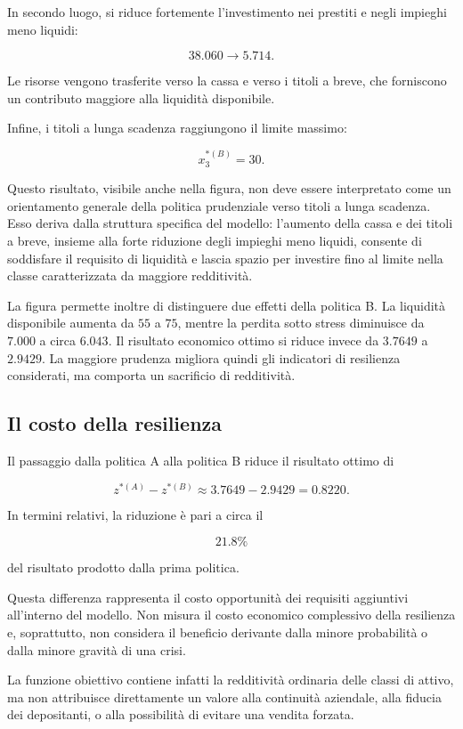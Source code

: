 In secondo luogo, si riduce fortemente l'investimento nei prestiti e negli
impieghi meno liquidi:

\[
38.060
\longrightarrow
5.714.
\]

Le risorse vengono trasferite verso la cassa e verso i titoli a breve, che
forniscono un contributo maggiore alla liquidit\`a disponibile.

Infine, i titoli a lunga scadenza raggiungono il limite massimo:

\[
x_3^{*(B)}=30.
\]

Questo risultato, visibile anche nella figura, non deve essere interpretato
come un orientamento generale della politica prudenziale verso titoli a lunga
scadenza. Esso deriva dalla struttura specifica del modello: l'aumento della
cassa e dei titoli a breve, insieme alla forte riduzione degli impieghi meno
liquidi, consente di soddisfare il requisito di liquidit\`a e lascia spazio
per investire fino al limite nella classe caratterizzata da maggiore
redditivit\`a.

La figura permette inoltre di distinguere due effetti della politica B. La
liquidit\`a disponibile aumenta da \(55\) a \(75\), mentre la perdita sotto
stress diminuisce da \(7.000\) a circa \(6.043\). Il risultato economico
ottimo si riduce invece da \(3.7649\) a \(2.9429\). La maggiore prudenza
migliora quindi gli indicatori di resilienza considerati, ma comporta un
sacrificio di redditivit\`a.

\subsection{Il costo della resilienza}

Il passaggio dalla politica A alla politica B riduce il risultato ottimo di

\[
z^{*(A)}-z^{*(B)}
\approx
3.7649-2.9429
=
0.8220.
\]

In termini relativi, la riduzione \`e pari a circa il

\[
21.8\%
\]

\noindent del risultato prodotto dalla prima politica.

Questa differenza rappresenta il costo opportunit\`a dei requisiti aggiuntivi
all'interno del modello. Non misura il costo economico complessivo della
resilienza e, soprattutto, non considera il beneficio derivante dalla minore
probabilit\`a o dalla minore gravit\`a di una crisi.

La funzione obiettivo contiene infatti la redditivit\`a ordinaria delle classi
di attivo, ma non attribuisce direttamente un valore alla continuit\`a
aziendale, alla fiducia dei depositanti, o alla possibilit\`a di evitare una
vendita forzata.

